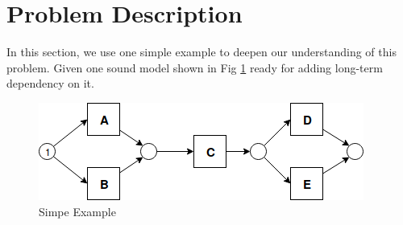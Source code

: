 \section{Problem Description}
In this section, we use one simple example to deepen our understanding of this problem. 
Given one sound model shown in Fig \ref{fig:seq-2-xor-model} ready for adding long-term dependency on it. 
\begin{figure}[!h]
	\includegraphics[width=\textwidth]{figures/algorithm/LT_Seq_01_Original.png}
	\caption{Simpe Example}
	\label{fig:seq-2-xor-model}
\end{figure}

